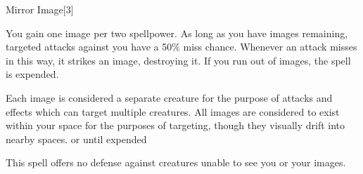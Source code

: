\begin{spellsection}{Mirror Image}[3]
    \begin{spellheader}
    \end{spellheader}
    \begin{spellcontent}
        \begin{spelltargetinginfo}
        \end{spelltargetinginfo}
        \begin{spelleffects}
            \spelleffect You gain one image per two spellpower. As long as you have images remaining, targeted attacks against you have a 50\% miss chance. Whenever an attack misses in this way, it strikes an image, destroying it. If you run out of images, the spell is expended.

            Each image is considered a separate creature for the purpose of attacks and effects which can target multiple creatures. All images are considered to exist within your space for the purposes of targeting, though they visually drift into nearby spaces.
            \spelldur \durshort or until expended \dismissable
        \end{spelleffects}
    \end{spellcontent}
    \begin{spellfooter}
        \spellnotes This spell offers no defense against creatures unable to see you or your images.
        \miscastexplode
    \end{spellfooter}
    \begin{spellaugments}
    \end{spellaugments}
\end{spellsection}

